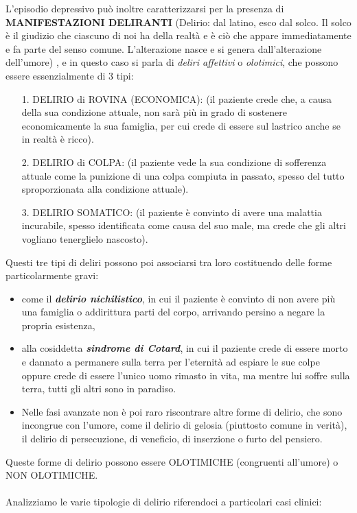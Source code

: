 L'episodio depressivo può inoltre caratterizzarsi per la presenza di
\textbf{MANIFESTAZIONI DELIRANTI} (Delirio: dal latino, esco dal solco.
Il solco è il giudizio che ciascuno di noi ha della realtà e è ciò che
appare immediatamente e fa parte del senso comune. L'alterazione nasce e
si genera dall'alterazione dell'umore) , e in questo caso si parla di
\emph{deliri affettivi} o \emph{olotimici}, che possono essere
essenzialmente di 3 tipi:

\begin{itemize}
\item[1.]
  DELIRIO di ROVINA (ECONOMICA): (il paziente crede che, a causa della
  sua condizione attuale, non sarà più in grado di sostenere
  economicamente la sua famiglia, per cui crede di essere sul lastrico
  anche se in realtà è ricco).
\item[2.]
  DELIRIO di COLPA: (il paziente vede la sua condizione di sofferenza
  attuale come la punizione di una colpa compiuta in passato, spesso del
  tutto sproporzionata alla condizione attuale).
\item[3.]
  DELIRIO SOMATICO: (il paziente è convinto di avere una malattia
  incurabile, spesso identificata come causa del suo male, ma crede che
  gli altri vogliano tenerglielo nascosto).
\end{itemize}

Questi tre tipi di deliri possono poi associarsi tra loro costituendo
delle forme particolarmente gravi:

\begin{itemize}
\item
  come il \textbf{\emph{delirio nichilistico}}, in cui il paziente è
  convinto di non avere più una famiglia o addirittura parti del corpo,
  arrivando persino a negare la propria esistenza,
\item
  alla cosiddetta \textbf{\emph{sindrome di Cotard}}, in cui il paziente
  crede di essere morto e dannato a permanere sulla terra per l'eternità
  ad espiare le sue colpe oppure crede di essere l'unico uomo rimasto in
  vita, ma mentre lui soffre sulla terra, tutti gli altri sono in
  paradiso.
\item
  Nelle fasi avanzate non è poi raro riscontrare altre forme di delirio,
  che sono incongrue con l'umore, come il delirio di gelosia (piuttosto
  comune in verità), il delirio di persecuzione, di veneficio, di
  inserzione o furto del pensiero.
\end{itemize}

Queste forme di delirio possono essere OLOTIMICHE (congruenti all'umore)
o NON OLOTIMICHE.
\\\\
Analizziamo le varie tipologie di delirio riferendoci a particolari casi
clinici:

